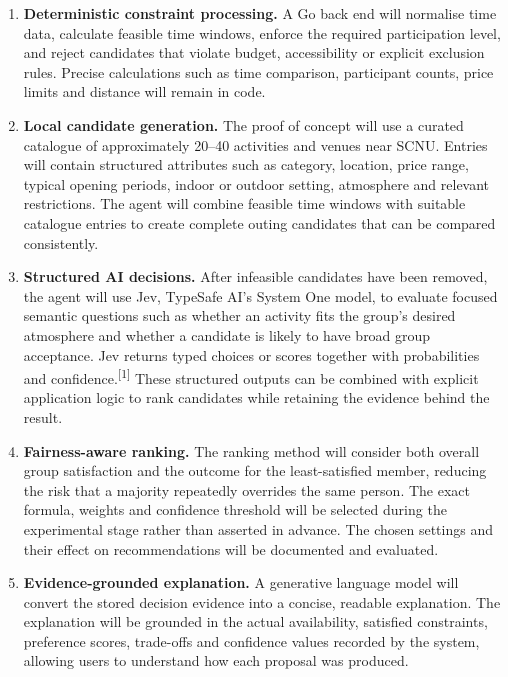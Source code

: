 \documentclass[12pt,a4paper]{article}
\newcommand{\sourcecite}[1]{\textsuperscript{[#1]}}
\begin{document}
\begin{enumerate}
  \item \textbf{Deterministic constraint processing.} A Go back end will normalise time data, calculate feasible time windows, enforce the required participation level, and reject candidates that violate budget, accessibility or explicit exclusion rules. Precise calculations such as time comparison, participant counts, price limits and distance will remain in code.

  \item \textbf{Local candidate generation.} The proof of concept will use a curated catalogue of approximately 20--40 activities and venues near SCNU. Entries will contain structured attributes such as category, location, price range, typical opening periods, indoor or outdoor setting, atmosphere and relevant restrictions. The agent will combine feasible time windows with suitable catalogue entries to create complete outing candidates that can be compared consistently.

  \item \textbf{Structured AI decisions.} After infeasible candidates have been removed, the agent will use Jev, TypeSafe AI's System One model, to evaluate focused semantic questions such as whether an activity fits the group's desired atmosphere and whether a candidate is likely to have broad group acceptance. Jev returns typed choices or scores together with probabilities and confidence.\sourcecite{1} These structured outputs can be combined with explicit application logic to rank candidates while retaining the evidence behind the result.

  \item \textbf{Fairness-aware ranking.} The ranking method will consider both overall group satisfaction and the outcome for the least-satisfied member, reducing the risk that a majority repeatedly overrides the same person. The exact formula, weights and confidence threshold will be selected during the experimental stage rather than asserted in advance. The chosen settings and their effect on recommendations will be documented and evaluated.

  \item \textbf{Evidence-grounded explanation.} A generative language model will convert the stored decision evidence into a concise, readable explanation. The explanation will be grounded in the actual availability, satisfied constraints, preference scores, trade-offs and confidence values recorded by the system, allowing users to understand how each proposal was produced.
\end{enumerate}
\end{document}
